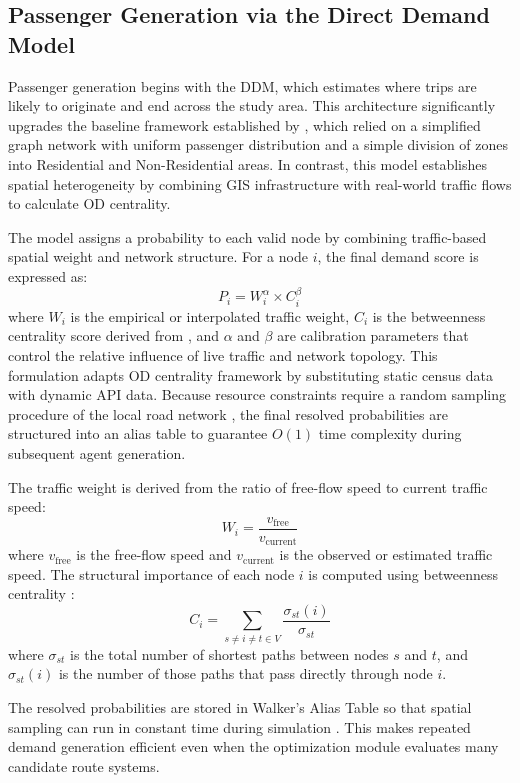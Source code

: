 {{\subsection{Passenger Generation via the Direct Demand Model}
\noindent
Passenger generation begins with the \ac{DDM}, which estimates where trips are likely to originate and end across the study area. This architecture significantly upgrades the baseline framework established by \citep{sanchez2025}, which relied on a simplified graph network with uniform passenger distribution and a simple division of zones into Residential and Non-Residential areas. In contrast, this model establishes spatial heterogeneity by combining \ac{GIS} infrastructure with real-world traffic flows to calculate \ac{OD} centrality.

The model assigns a probability to each valid node by combining traffic-based spatial weight and network structure. For a node $i$, the final demand score is expressed as:
\[
P_i = W_i^\alpha \times C_i^\beta
\]
where $W_i$ is the empirical or interpolated traffic weight, $C_i$ is the betweenness centrality score derived from \citep{Freeman1977}, and $\alpha$ and $\beta$ are calibration parameters that control the relative influence of live traffic and network topology. This formulation adapts \citep{Lowry2014} \ac{OD} centrality framework by substituting static census data with dynamic \ac{API} data. Because resource constraints require a random sampling procedure of the local road network \citep{BowlingAultmanHall2003}, the final resolved probabilities are structured into an alias table \citep{Walker1977} to guarantee \(O(1)\) time complexity during subsequent agent generation.

The traffic weight is derived from the ratio of free-flow speed to current traffic speed:
\[
W_i = \frac{v_{\text{free}}}{v_{\text{current}}}
\]
where $v_{\text{free}}$ is the free-flow speed and $v_{\text{current}}$ is the observed or estimated traffic speed. The structural importance of each node $i$ is computed using betweenness centrality \citep{Freeman1977}:
\[
C_i = \sum_{s \neq i \neq t \in V} \frac{\sigma_{st}(i)}{\sigma_{st}}
\]
where $\sigma_{st}$ is the total number of shortest paths between nodes $s$ and $t$, and $\sigma_{st}(i)$ is the number of those paths that pass directly through node $i$.

The resolved probabilities are stored in Walker's Alias Table so that spatial sampling can run in constant time during simulation \citep{Walker1977}. This makes repeated demand generation efficient even when the optimization module evaluates many candidate route systems.

}}
